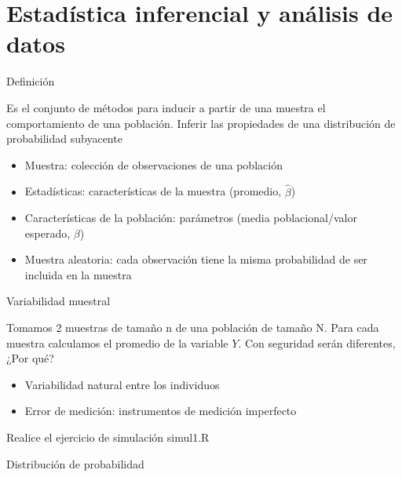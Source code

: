 \documentclass{beamer}
\begin{document}
\section{Estadística inferencial y análisis de datos}

\begin{frame}{Definición}

Es el conjunto de métodos para inducir a partir de una muestra el comportamiento de una población. Inferir las propiedades de una distribución de probabilidad subyacente

\begin{itemize}
    \item Muestra: colección de observaciones de una población
    \item Estadísticas: características de la muestra (promedio, $\hat{\beta}$)
    \item Características de la población: parámetros (media poblacional/valor esperado, $\beta$)
    \item Muestra aleatoria: cada observación tiene la misma probabilidad de ser incluida en la muestra
\end{itemize}
    
\end{frame}

\begin{frame}{Variabilidad muestral}

Tomamos 2 muestras de tamaño n de una población de tamaño N. Para cada muestra calculamos el promedio de la variable $Y$. Con seguridad serán diferentes, ¿Por qué?

\begin{itemize}
    \item Variabilidad natural entre los individuos
    \item Error de medición: instrumentos de medición imperfecto
\end{itemize}

    Realice el ejercicio de simulación simul1.R
\end{frame}

\begin{frame}{Distribución de probabilidad}
    
\end{frame}

\printbibliography
\end{document}

